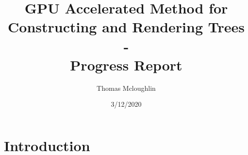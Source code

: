 \documentclass[progress]{cmpreport}
\title{GPU Accelerated Method for Constructing and Rendering Trees 
        \\ - \\ 
        Progress Report}
\author{Thomas Mcloughlin}
\date{3/12/2020}
\begin{document}
\maketitle

\section{Introduction}

\clearpage

\end{document}
